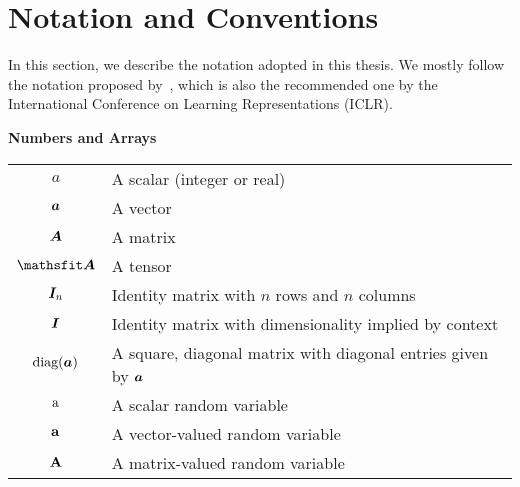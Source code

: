 \chapter*{Notation and Conventions}
\label{notation}

\newlength{\notationgap}
\setlength{\notationgap}{1pc}

In this section, we describe the notation adopted in this thesis. We mostly follow the notation proposed by~\citet{Goodfellow2016}, which is also the recommended one by the International Conference on Learning Representations (ICLR).

\vspace{\notationgap}
\begin{minipage}{\textwidth}
	\centerline{\bf Numbers and Arrays}
	\bgroup
	\def\arraystretch{1.5}
	\begin{tabular}{cp{3.25in}}
		$\displaystyle a$ & A scalar (integer or real)\\
		$\displaystyle {\bm{a}}$ & A vector\\
		$\displaystyle {\bm{A}}$ & A matrix\\
		$\displaystyle \tA$ & A tensor\\
		$\displaystyle {\bm{I}}_n$ & Identity matrix with $n$ rows and $n$ columns\\
		$\displaystyle {\bm{I}}$ & Identity matrix with dimensionality implied by context\\
		$\displaystyle \text{diag}({\bm{a}})$ & A square, diagonal matrix with diagonal entries given by ${\bm{a}}$\\
		$\displaystyle {\textnormal{a}}$ & A scalar random variable\\
		$\displaystyle {\mathbf{a}}$ & A vector-valued random variable\\
		$\displaystyle {\mathbf{A}}$ & A matrix-valued random variable\\
	\end{tabular}
	\egroup
\end{minipage}

